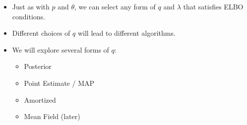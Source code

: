 




\begin{frame}
\begin{itemize}
    
    \item Just as with $p$ and $\theta$, we can select any form of $q$ and $\lambda$ that satisfies ELBO conditions. 
    \item Different choices of $q$ will lead to different algorithms.
    \item We will explore several forms of $q$: 
    \begin{itemize}
        \item Posterior
        \item Point Estimate / MAP
        \item Amortized
        \item Mean Field (later)
    \end{itemize}
\end{itemize}
\end{frame}

